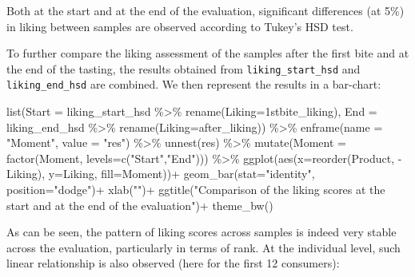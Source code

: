 \documentclass[
]{book}
\newenvironment{Shaded}{\begin{snugshade}}{\end{snugshade}}
\newcommand{\AttributeTok}[1]{\textcolor[rgb]{0.77,0.63,0.00}{#1}}
\newcommand{\FunctionTok}[1]{\textcolor[rgb]{0.00,0.00,0.00}{#1}}
\newcommand{\NormalTok}[1]{#1}
\newcommand{\SpecialCharTok}[1]{\textcolor[rgb]{0.00,0.00,0.00}{#1}}
\newcommand{\StringTok}[1]{\textcolor[rgb]{0.31,0.60,0.02}{#1}}
\begin{document}
Both at the start and at the end of the evaluation, significant differences (at 5\%) in liking between samples are observed according to Tukey's HSD test.

To further compare the liking assessment of the samples after the first bite and at the end of the tasting, the results obtained from \texttt{liking\_start\_hsd} and \texttt{liking\_end\_hsd} are combined. We then represent the results in a bar-chart:

\begin{Shaded}
\begin{Highlighting}[]
\FunctionTok{list}\NormalTok{(}\AttributeTok{Start =}\NormalTok{ liking\_start\_hsd }\SpecialCharTok{\%\textgreater{}\%} \FunctionTok{rename}\NormalTok{(}\AttributeTok{Liking=}\StringTok{\textasciigrave{}}\AttributeTok{1stbite\_liking}\StringTok{\textasciigrave{}}\NormalTok{), }
     \AttributeTok{End =}\NormalTok{ liking\_end\_hsd }\SpecialCharTok{\%\textgreater{}\%} \FunctionTok{rename}\NormalTok{(}\AttributeTok{Liking=}\StringTok{\textasciigrave{}}\AttributeTok{after\_liking}\StringTok{\textasciigrave{}}\NormalTok{)) }\SpecialCharTok{\%\textgreater{}\%} 
  \FunctionTok{enframe}\NormalTok{(}\AttributeTok{name =} \StringTok{"Moment"}\NormalTok{, }\AttributeTok{value =} \StringTok{"res"}\NormalTok{) }\SpecialCharTok{\%\textgreater{}\%} 
  \FunctionTok{unnest}\NormalTok{(res) }\SpecialCharTok{\%\textgreater{}\%} 
  \FunctionTok{mutate}\NormalTok{(}\AttributeTok{Moment =} \FunctionTok{factor}\NormalTok{(Moment, }\AttributeTok{levels=}\FunctionTok{c}\NormalTok{(}\StringTok{"Start"}\NormalTok{,}\StringTok{"End"}\NormalTok{))) }\SpecialCharTok{\%\textgreater{}\%} 
  \FunctionTok{ggplot}\NormalTok{(}\FunctionTok{aes}\NormalTok{(}\AttributeTok{x=}\FunctionTok{reorder}\NormalTok{(Product, }\SpecialCharTok{{-}}\NormalTok{Liking), }\AttributeTok{y=}\NormalTok{Liking, }\AttributeTok{fill=}\NormalTok{Moment))}\SpecialCharTok{+}
  \FunctionTok{geom\_bar}\NormalTok{(}\AttributeTok{stat=}\StringTok{"identity"}\NormalTok{, }\AttributeTok{position=}\StringTok{"dodge"}\NormalTok{)}\SpecialCharTok{+}
  \FunctionTok{xlab}\NormalTok{(}\StringTok{""}\NormalTok{)}\SpecialCharTok{+}
  \FunctionTok{ggtitle}\NormalTok{(}\StringTok{"Comparison of the liking scores at the start and at the end of the evaluation"}\NormalTok{)}\SpecialCharTok{+}
  \FunctionTok{theme\_bw}\NormalTok{()}
\end{Highlighting}
\end{Shaded}

As can be seen, the pattern of liking scores across samples is indeed very stable across the evaluation, particularly in terms of rank. At the individual level, such linear relationship is also observed (here for the first 12 consumers):
\end{document}

